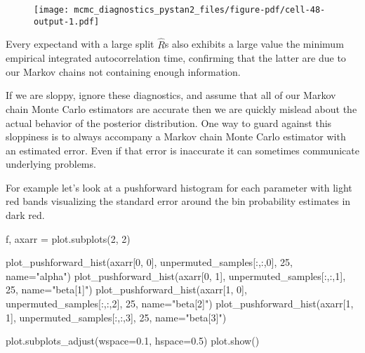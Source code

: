 \documentclass[
  letterpaper,
  DIV=11,
  numbers=noendperiod]{scrartcl}
\newenvironment{Shaded}{\begin{snugshade}}{\end{snugshade}}
\newcommand{\DecValTok}[1]{\textcolor[rgb]{0.68,0.00,0.00}{#1}}
\newcommand{\FloatTok}[1]{\textcolor[rgb]{0.68,0.00,0.00}{#1}}
\newcommand{\NormalTok}[1]{\textcolor[rgb]{0.00,0.23,0.31}{#1}}
\newcommand{\OperatorTok}[1]{\textcolor[rgb]{0.37,0.37,0.37}{#1}}
\newcommand{\StringTok}[1]{\textcolor[rgb]{0.13,0.47,0.30}{#1}}
\begin{document}
\begin{figure}[H]

{\centering \texttt{[image: mcmc\_diagnostics\_pystan2\_files/figure-pdf/cell-48-output-1.pdf]}

}

\end{figure}

Every expectand with a large split \(\hat{R}\)s also exhibits a large
value the minimum empirical integrated autocorrelation time, confirming
that the latter are due to our Markov chains not containing enough
information.

If we are sloppy, ignore these diagnostics, and assume that all of our
Markov chain Monte Carlo estimators are accurate then we are quickly
mislead about the actual behavior of the posterior distribution. One way
to guard against this sloppiness is to always accompany a Markov chain
Monte Carlo estimator with an estimated error. Even if that error is
inaccurate it can sometimes communicate underlying problems.

For example let's look at a pushforward histogram for each parameter
with light red bands visualizing the standard error around the bin
probability estimates in dark red.

\begin{Shaded}
\begin{Highlighting}[]
\NormalTok{f, axarr }\OperatorTok{=}\NormalTok{ plot.subplots(}\DecValTok{2}\NormalTok{, }\DecValTok{2}\NormalTok{)}

\NormalTok{plot\_pushforward\_hist(axarr[}\DecValTok{0}\NormalTok{, }\DecValTok{0}\NormalTok{], unpermuted\_samples[:,:,}\DecValTok{0}\NormalTok{], }\DecValTok{25}\NormalTok{, name}\OperatorTok{=}\StringTok{"alpha"}\NormalTok{)}
\NormalTok{plot\_pushforward\_hist(axarr[}\DecValTok{0}\NormalTok{, }\DecValTok{1}\NormalTok{], unpermuted\_samples[:,:,}\DecValTok{1}\NormalTok{], }\DecValTok{25}\NormalTok{, name}\OperatorTok{=}\StringTok{"beta[1]"}\NormalTok{)}
\NormalTok{plot\_pushforward\_hist(axarr[}\DecValTok{1}\NormalTok{, }\DecValTok{0}\NormalTok{], unpermuted\_samples[:,:,}\DecValTok{2}\NormalTok{], }\DecValTok{25}\NormalTok{, name}\OperatorTok{=}\StringTok{"beta[2]"}\NormalTok{)}
\NormalTok{plot\_pushforward\_hist(axarr[}\DecValTok{1}\NormalTok{, }\DecValTok{1}\NormalTok{], unpermuted\_samples[:,:,}\DecValTok{3}\NormalTok{], }\DecValTok{25}\NormalTok{, name}\OperatorTok{=}\StringTok{"beta[3]"}\NormalTok{)}

\NormalTok{plot.subplots\_adjust(wspace}\OperatorTok{=}\FloatTok{0.1}\NormalTok{, hspace}\OperatorTok{=}\FloatTok{0.5}\NormalTok{)}
\NormalTok{plot.show()}
\end{Highlighting}
\end{Shaded}
\end{document}
